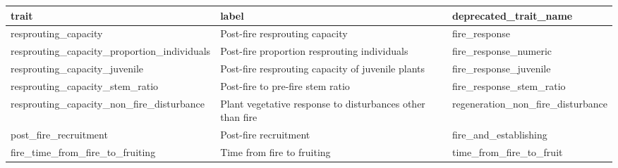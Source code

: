 \documentclass[
  letterpaper,
  DIV=11,
  numbers=noendperiod]{scrartcl}
\begin{document}
\begin{tabular}{>{\raggedright\arraybackslash}p{7.4cm}>{\raggedright\arraybackslash}p{3.5cm}>{\raggedright\arraybackslash}p{6cm}}
\toprule
trait & label & deprecated\_trait\_name\\
\midrule
resprouting\_capacity & Post-fire resprouting capacity & fire\_response\\
resprouting\_capacity\_proportion\_individuals & Post-fire proportion resprouting individuals & fire\_response\_numeric\\
resprouting\_capacity\_juvenile & Post-fire resprouting capacity of juvenile plants & fire\_response\_juvenile\\
resprouting\_capacity\_stem\_ratio & Post-fire to pre-fire stem ratio & fire\_response\_stem\_ratio\\
resprouting\_capacity\_non\_fire\_disturbance & Plant vegetative response to disturbances other than fire & regeneration\_non\_fire\_disturbance\\
\addlinespace
post\_fire\_recruitment & Post-fire recruitment & fire\_and\_establishing\\
fire\_time\_from\_fire\_to\_fruiting & Time from fire to fruiting & time\_from\_fire\_to\_fruit\\
\bottomrule
\end{tabular}
\end{document}
